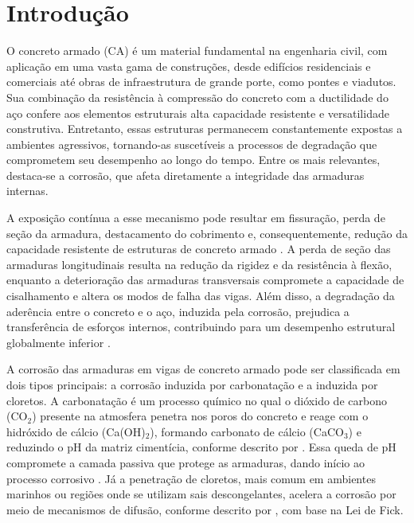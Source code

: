 \chapter{Introdução}

O concreto armado (CA) é um material fundamental na engenharia civil, com aplicação em uma vasta gama de construções, desde edifícios residenciais e comerciais até obras de infraestrutura de grande porte, como pontes e viadutos. Sua combinação da resistência à compressão do concreto com a ductilidade do aço confere aos elementos estruturais alta capacidade resistente e versatilidade construtiva. Entretanto, essas estruturas permanecem constantemente expostas a ambientes agressivos, tornando-as suscetíveis a processos de degradação que comprometem seu desempenho ao longo do tempo. Entre os mais relevantes, destaca-se a corrosão, que afeta diretamente a integridade das armaduras internas. 

A exposição contínua a esse mecanismo pode resultar em fissuração, perda de seção da armadura, destacamento do cobrimento e, consequentemente, redução da capacidade resistente de estruturas de concreto armado \cite{vu_structural_2000, pereira_junior_reliability_2023, soltani_state---art_2019, possan_co2_2016}. A perda de seção das armaduras longitudinais resulta na redução da rigidez e da resistência à flexão, enquanto a deterioração das armaduras transversais compromete a capacidade de cisalhamento e altera os modos de falha das vigas. Além disso, a degradação da aderência entre o concreto e o aço, induzida pela corrosão, prejudica a transferência de esforços internos, contribuindo para um desempenho estrutural globalmente inferior \cite{soltani_state---art_2019}.

A corrosão das armaduras em vigas de concreto armado pode ser classificada em dois tipos principais: a corrosão induzida por carbonatação e a induzida por cloretos. A carbonatação é um processo químico no qual o dióxido de carbono (CO\(_2\)) presente na atmosfera penetra nos poros do concreto e reage com o hidróxido de cálcio (Ca(OH)\(_2\)), formando carbonato de cálcio (CaCO\(_3\)) e reduzindo o pH da matriz cimentícia, conforme descrito por \textcite{helene_p_r_l_concreto_1993, ortega_assessment_2016}. Essa queda de pH compromete a camada passiva que protege as armaduras, dando início ao processo corrosivo \cite{possan_co2_2016}. Já a penetração de cloretos, mais comum em ambientes marinhos ou regiões onde se utilizam sais descongelantes, acelera a corrosão por meio de mecanismos de difusão, conforme descrito por \textcite{vu_structural_2000}, com base na Lei de Fick.

